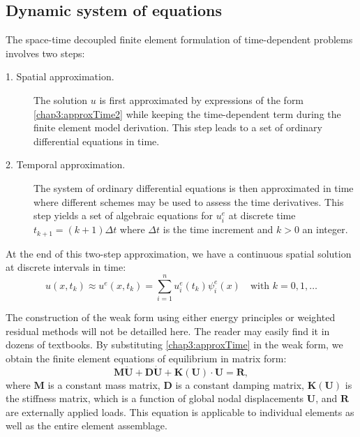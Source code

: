 	\subsection{Dynamic system of equations}	 \label{chap3:dynamic}
The space-time decoupled finite element formulation of time-dependent problems involves two steps:
\begin{description}
\item[1. Spatial approximation.]
The solution $ u $ is first approximated by expressions of the form \eqref{chap3:approxTime2} while keeping the time-dependent term during the finite element model derivation. This step leads to a set of ordinary differential equations in time.
\item[2. Temporal approximation.]
The system of ordinary differential equations is then approximated in time where different schemes may be used to assess the time derivatives. This step yields a set of algebraic equations for $ u^e_i $ at discrete time $ t_{k+1} = (k+1) \Delta t$ where $ \Delta t $ is the time increment and $ k > 0$ an integer. 
\end{description}
At the end of this two-step approximation, we have a continuous spatial solution at discrete intervals in time:
\begin{equation}
\label{chap3:approxTime}
u(x, t_k) \approx u^e(x, t_k) = \sum_{i=1}^n u^e_i(t_k) \psi^e_i(x) \quad \text{with } k = 0, 1, \ldots
\end{equation}
	
The construction of the weak form using either energy principles or weighted residual methods will not be detailled here. The reader may easily find it in dozens of textbooks. By substituting \eqref{chap3:approxTime} in the weak form, we obtain the finite element equations of equilibrium in matrix form:
\begin{equation}
\label{chap3:eqDynamic}
\mathbf{M} \mathbf{\ddot U} + \mathbf{D} \mathbf{ \dot U} + \mathbf{K}(\mathbf{U}) \cdot \mathbf{U} = \mathbf{R},
\end{equation}
where $ \mathbf{M} $ is a constant mass matrix, $\mathbf{D}$ is a constant damping matrix, $ \mathbf{K}(\mathbf{U}) $ is the stiffness matrix, which is a function of global nodal displacements $\mathbf{U}$, and $\mathbf{R}$ are externally applied loads. This equation is applicable to individual elements as well as the entire element assemblage.

